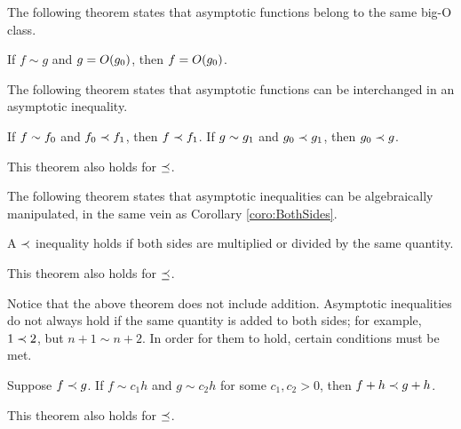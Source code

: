The following theorem states that asymptotic functions belong to the same big-O class.

\begin{theorem}
\label{thm:SameBigOClass}
	If $f \sim g$ and $g = O(g_0)$, then $f = O(g_0)$.
\end{theorem}

The following theorem states that asymptotic functions can be interchanged in an asymptotic inequality.

\begin{theorem}
\label{thm:InterchangeableInInequality}
	If $f \sim f_0$ and $f_0 \prec f_1$, then $f \prec f_1$. If $g \sim g_1$ and $g_0 \prec g_1$, then $g_0 \prec g$.
\end{theorem}

\begin{corollary}
\label{coro:InterchangeableInNonStrictInequality}
	This theorem also holds for $\preceq$.
\end{corollary}

The following theorem states that asymptotic inequalities can be algebraically manipulated, in the same vein as Corollary \ref{coro:BothSides}.

\begin{theorem}
\label{thm:BothSidesInequality}
	A $\prec$ inequality holds if both sides are multiplied or divided by the same quantity.
\end{theorem}

\begin{corollary}
\label{coro:BothSidesNonStrictInequality}
	This theorem also holds for $\preceq$.
\end{corollary}

Notice that the above theorem does not include addition. Asymptotic inequalities do not always hold if the same quantity is added to both sides; for example, $1 \prec 2$, but $n + 1 \sim n + 2$. In order for them to hold, certain conditions must be met.

\begin{theorem}
\label{thm:BothSidesInequalityAdd}
	Suppose $f \prec g$. If $f \sim c_1 h$ and $g \sim c_2 h$ for some $c_1, c_2 > 0$, then $f + h \prec g + h$.
\end{theorem}

\begin{corollary}
\label{coro:BothSidesNonStrictInequalityAdd}
	This theorem also holds for $\preceq$.
\end{corollary}
